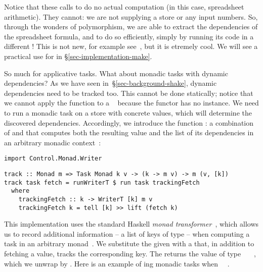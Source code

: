 \noindent
Notice that these calls to  do no actual computation (in this
case, spreadsheet arithmetic). They cannot: we are not supplying a store or any
input numbers. So, through the wonders of polymorphism, we are able to extract
the dependencies of the spreadsheet formula, and to do so efficiently, simply by
running its code in a different ! This is not new, for example
see~\cite{free-applicatives}, but it is etremely cool.  We will see a practical
use for  in \S\ref{sec-implementation-make}.

So much for applicative tasks. What about monadic tasks with dynamic
dependencies? As we have seen in~\S\ref{sec-background-shake}, dynamic
dependencies need to be tracked too. This cannot be done statically; notice that
we cannot apply the function  to a ~ because
the  functor has no  instance. We need to run a monadic task
on a store with concrete values, which will determine the discovered
dependencies. Accordingly, we introduce the function : a combination
of  and  that computes both the resulting value and
the list of its dependencies in an arbitrary monadic context~:

\vspace{1mm}
\begin{verbatim}
import Control.Monad.Writer
\end{verbatim}
\vspace{0.5mm}
\begin{verbatim}
track :: Monad m => Task Monad k v -> (k -> m v) -> m (v, [k])
track task fetch = runWriterT $ run task trackingFetch
  where
    trackingFetch :: k -> WriterT [k] m v
    trackingFetch k = tell [k] >> lift (fetch k)
\end{verbatim}
\vspace{1mm}

\noindent
This implementation uses the standard Haskell  \emph{monad
transformer}~\cite{liang1995monad}, which allows us
to record additional information -- a list of keys of type \hs{[@@k]} -- when
computing a task in an arbitrary monad~. We substitute the given 
with a  that, in addition to fetching a value, tracks the
corresponding key. The  returns the value of type
~\hs{[@@k]}~~, which we unwrap by . Here
is an example of ing monadic tasks when ~\hs{=}~.


